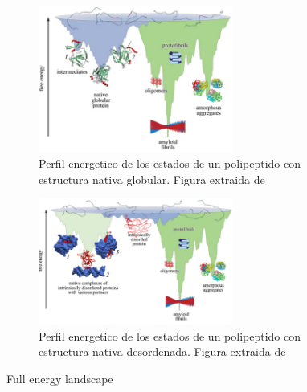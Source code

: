 \begin{figure}[ht!]
\centering
\begin{subfigure}[ht]{\linewidth}
\includegraphics[width=0.7\textwidth]{img/globularEnLandscape.png} 
\centering
\caption{Perfil energetico de los estados de un polipeptido con estructura nativa globular. Figura extraida de \cite{turoverov2010protein}}
\label{globularFullEnLandscape}
\end{subfigure}

\begin{subfigure}[ht]{\linewidth}
\centering
\includegraphics[width=0.7\textwidth]{img/idpEnLandscape.png} 
\caption{Perfil energetico de los estados de un polipeptido con estructura nativa desordenada. Figura extraida de \cite{turoverov2010protein}}
\label{idpFullEnLandscape}
\end{subfigure}
 \caption{Full energy landscape}
 \label{fullEnLandscape}
\end{figure}


